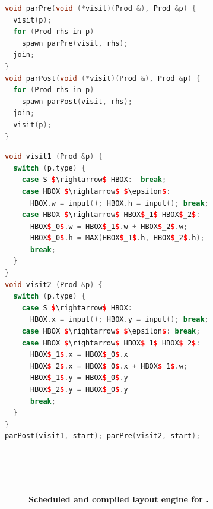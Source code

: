 \newsavebox{\traversals}
\begin{lrbox}{\traversals}%
\begin{lstlisting}[mathescape,language=C++,morekeywords={spawn,join}]
void parPre(void (*visit)(Prod &), Prod &p) {
  visit(p);
  for (Prod rhs in p) 
    spawn parPre(visit, rhs);
  join;
}
void parPost(void (*visit)(Prod &), Prod &p) {
  for (Prod rhs in p) 
    spawn parPost(visit, rhs);
  join;
  visit(p);
}
\end{lstlisting}
\end{lrbox}

\newsavebox{\hboxvisitors}
\begin{lrbox}{\hboxvisitors}%
\begin{lstlisting}[mathescape,language=C++]
void visit1 (Prod &p) {
  switch (p.type) {
    case S $\rightarrow$ HBOX:  break;
    case HBOX $\rightarrow$ $\epsilon$:
      HBOX.w = input(); HBOX.h = input(); break;
    case HBOX $\rightarrow$ HBOX$_1$ HBOX$_2$:
      HBOX$_0$.w = HBOX$_1$.w + HBOX$_2$.w;
      HBOX$_0$.h = MAX(HBOX$_1$.h, HBOX$_2$.h);
      break;
  }
}
void visit2 (Prod &p) {
  switch (p.type) {
    case S $\rightarrow$ HBOX:
      HBOX.x = input(); HBOX.y = input(); break;
    case HBOX $\rightarrow$ $\epsilon$: break;
    case HBOX $\rightarrow$ HBOX$_1$ HBOX$_2$:
      HBOX$_1$.x = HBOX$_0$.x
      HBOX$_2$.x = HBOX$_0$.x + HBOX$_1$.w;
      HBOX$_1$.y = HBOX$_0$.y
      HBOX$_2$.y = HBOX$_0$.y
      break;
  }
}
parPost(visit1, start); parPre(visit2, start);
\end{lstlisting}
\end{lrbox}


\begin{figure}
 \\
 \\
 \\
\caption{\textbf{Scheduled and compiled layout engine for \hlang{}.}}
\label{fig:hboxall}
\end{figure}


